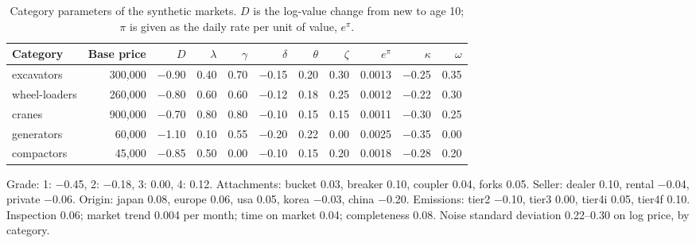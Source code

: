 \begin{table}[h]
\centering\small
\caption{Category parameters of the synthetic markets. $D$ is the log-value change from new to age 10; $\pi$ is given as the daily rate per unit of value, $e^{\pi}$.}
\begin{tabular}{lrrrrrrrrrr}
\toprule
Category & Base price & $D$ & $\lambda$ & $\gamma$ & $\delta$ & $\theta$ & $\zeta$ & $e^{\pi}$ & $\kappa$ & $\omega$ \\
\midrule
excavators & 300,000 & $-$0.90 & 0.40 & 0.70 & $-$0.15 & 0.20 & 0.30 & 0.0013 & $-$0.25 & 0.35 \\
wheel-loaders & 260,000 & $-$0.80 & 0.60 & 0.60 & $-$0.12 & 0.18 & 0.25 & 0.0012 & $-$0.22 & 0.30 \\
cranes & 900,000 & $-$0.70 & 0.80 & 0.80 & $-$0.10 & 0.15 & 0.15 & 0.0011 & $-$0.30 & 0.25 \\
generators & 60,000 & $-$1.10 & 0.10 & 0.55 & $-$0.20 & 0.22 & 0.00 & 0.0025 & $-$0.35 & 0.00 \\
compactors & 45,000 & $-$0.85 & 0.50 & 0.00 & $-$0.10 & 0.15 & 0.20 & 0.0018 & $-$0.28 & 0.20 \\
\bottomrule
\end{tabular}

\vspace{0.6em}
Grade: 1: $-$0.45, 2: $-$0.18, 3: 0.00, 4: 0.12.
Attachments: bucket 0.03, breaker 0.10, coupler 0.04, forks 0.05.
Seller: dealer 0.10, rental $-$0.04, private $-$0.06.
Origin: japan 0.08, europe 0.06, usa 0.05, korea $-$0.03, china $-$0.20.
Emissions: tier2 $-$0.10, tier3 0.00, tier4i 0.05, tier4f 0.10.
Inspection 0.06; market trend 0.004 per month; time on market 0.04; completeness 0.08.
Noise standard deviation 0.22--0.30 on log price, by category.
\end{table}
